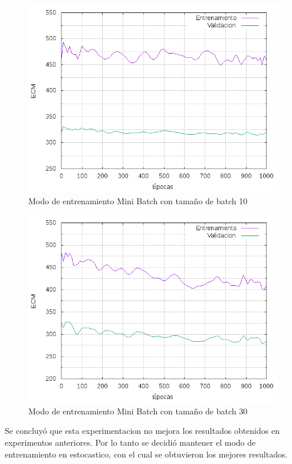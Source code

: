 \begin{figure}[H]
  \includegraphics[width=125mm]{imagenes/ej1/ex_4-2_red_11-6-6-9-1_errors.png}
  \caption{Modo de entrenamiento Mini Batch con tamaño de batch 10}
\end{figure}

\begin{figure}[H]
  \includegraphics[width=125mm]{imagenes/ej1/ex_4-3_red_11-6-6-9-1_errors.png}
  \caption{Modo de entrenamiento Mini Batch con tamaño de batch 30}
\end{figure}

Se concluyó que esta experimentacion no mejora los resultados obtenidos en experimentos anteriores. Por lo tanto se decidió
mantener el modo de entrenamiento en estocastico, con el cual se obtuvieron los mejores resultados.

